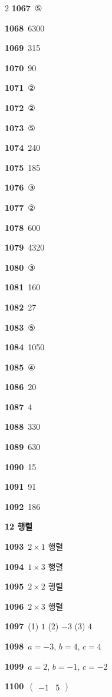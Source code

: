 \documentclass[10pt,a4paper]{article}
\begin{document}
\begin{multicols}{2}
\noindent\textbf{1067}\ ⑤\par
\noindent\textbf{1068}\ 6300\par
\noindent\textbf{1069}\ 315\par
\noindent\textbf{1070}\ 90\par
\noindent\textbf{1071}\ ②\par
\noindent\textbf{1072}\ ②\par
\noindent\textbf{1073}\ ⑤\par
\noindent\textbf{1074}\ 240\par
\noindent\textbf{1075}\ 185\par
\noindent\textbf{1076}\ ③\par
\noindent\textbf{1077}\ ②\par
\noindent\textbf{1078}\ 600\par
\noindent\textbf{1079}\ 4320\par
\noindent\textbf{1080}\ ③\par
\noindent\textbf{1081}\ 160\par
\noindent\textbf{1082}\ 27\par
\noindent\textbf{1083}\ ⑤\par
\noindent\textbf{1084}\ 1050\par
\noindent\textbf{1085}\ ④\par
\noindent\textbf{1086}\ 20\par
\noindent\textbf{1087}\ 4\par
\noindent\textbf{1088}\ 330\par
\noindent\textbf{1089}\ 630\par
\noindent\textbf{1090}\ 15\par
\noindent\textbf{1091}\ 91\par
\noindent\textbf{1092}\ 186\par
\noindent\textbf{12 행렬}\par\smallskip
\noindent\textbf{1093}\ $2\times 1$ 행렬\par
\noindent\textbf{1094}\ $1\times 3$ 행렬\par
\noindent\textbf{1095}\ $2\times 2$ 행렬\par
\noindent\textbf{1096}\ $2\times 3$ 행렬\par
\noindent\textbf{1097}\ (1) $1$ (2) $-3$ (3) $4$\par
\noindent\textbf{1098}\ $a=-3$, $b=4$, $c=4$\par
\noindent\textbf{1099}\ $a=2$, $b=-1$, $c=-2$\par
\noindent\textbf{1100}\ $\begin{pmatrix} -1 & 5 \end{pmatrix}$\par

\end{multicols}
\end{document}
